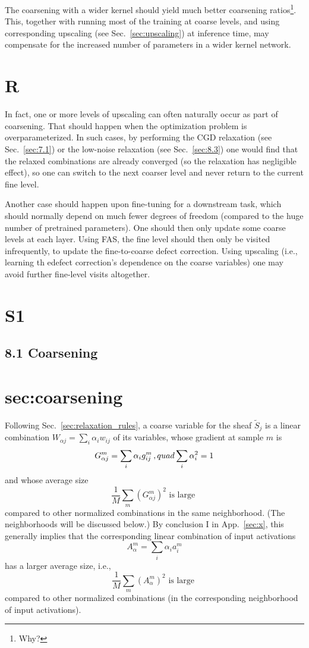 \documentclass{article} %
\begin{document}
The coarsening with a wider kernel should yield much better coarsening ratios\footnote{Why?}. This, together with running most of the training at coarse levels, and using corresponding upscaling (see Sec.~\ref{sec:upscaling}) at inference time, may compensate for the increased number of parameters in a wider kernel network.

\section{R}
In fact, one or more levels of upscaling can often naturally occur as part of coarsening. That should happen when the optimization problem is overparameterized. In such cases, by performing the CGD relaxation (see Sec.~\ref{sec:7.1}) or the low-noise relaxation (see Sec.~\ref{sec:8.3}) one would find that the relaxed combinations are already converged (so the relaxation has negligible effect), so one can switch to the next coarser level and never return to the current fine level.

Another case should happen upon fine-tuning for a downstream task, which should normally depend on much fewer degrees of freedom (compared to the huge number of pretrained parameters). One should then only update some coarse levels at each layer. Using FAS, the fine level should then only be visited infrequently, to update the fine-to-coarse defect correction. Using upscaling (i.e., learning th edefect correction's dependence on the coarse variables) one may avoid further fine-level visits altogether.

\section{S1}
\subsection{8.1 Coarsening}
\section{sec:coarsening}
Following Sec.~\ref{sec:relaxation_rules}, a coarse variable for the sheaf $\tilde{S}_j$ is a linear combination $W_{\alpha j} = \sum_i \alpha_i w_{ij}$ of its variables, whose gradient at sample $m$ is
$$ G^m_{\alpha j} = \sum_i \alpha_i g^m_{ij}\,, \\quad \sum_i \alpha_i^2 = 1 $$
and whose average size
\begin{equation}
    \frac{1}{M} \sum_m \left(G^m_{\alpha j} \right)^2 \text{ is large }
    \label{parameter_large_avg_size}
\end{equation}
compared to other normalized combinations in the same neighborhood. (The neighborhoods will be discussed below.) By conclusion I in App.~\ref{sec:x}, this generally implies that the corresponding linear combination of input activations
$$A^m_{\alpha} = \sum_i \alpha_i a^m_i$$
has a larger average size, i.e.,
\begin{equation}
    \frac{1}{M} \sum_m \left(A^m_{\alpha} \right)^2 \text{ is large }
    \label{activation_large_avg_size}
\end{equation}
compared to other normalized combinations (in the corresponding neighborhood of input activations).
\end{document}
